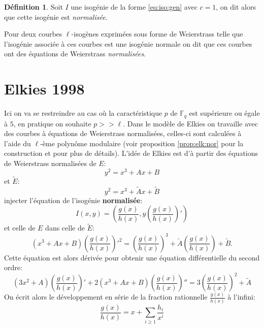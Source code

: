 \documentclass[10pt,a4paper]{book}
\theoremstyle{plain}
\theoremstyle{definition}
\theoremstyle{definition}
\theoremstyle{definition}
\theoremstyle{definition}
\newtheorem{defi}[thm]{Définition}
\theoremstyle{remark}
\theoremstyle{remark}
\theoremstyle{definition}
\begin{document}
\begin{defi}
Soit $I$ une isogénie de la forme \eqref{eq:iso:gen} avec $c=1$, on dit alors que cette isogénie est \emph{normalisée}. 

Pour deux courbes $\ell$-isogènes exprimées sous forme de Weierstrass telle que l'isogénie associée à ces courbes est une isogénie normale on dit que ces courbes ont des équations de Weierstrass \emph{normalisées}. 
\end{defi}
\section{Elkies 1998}
Ici on va se restreindre au cas où la caractéristique $p$ de $\mathbb{F}_q$ est supérieure ou égale à $5$, en pratique on souhaite $p >> \ell$.
Dans le modèle de Elkies on travaille avec des courbes à équations de Weierstrass normalisées, celles-ci sont calculées à l'aide du $\ell$-ème polynôme modulaire (voir proposition \ref{prop:elk:nor} pour la construction et \cite{Schoof95} pour plus de détails).
L'idée de Elkies est d'à partir des équations de Weierstrass normalisées de $E:$
\begin{equation}
y^2=x^3+Ax+B
\end{equation}
 et $\tilde{E}:$
\begin{equation}
y^2=x^3+\tilde{A}x+\tilde{B}
\end{equation}
injecter l'équation de l'isogénie \textbf{normalisée}:
\begin{equation} 
\label{eq:velu:gh}
I(x,y)=\left(\frac{g(x)}{h(x)},y\left( \frac{g(x)}{h(x)} \right)'\right) 
\end{equation}
et celle de $E$ dans celle de $\tilde{E}$:
\begin{equation}
(x^3+Ax+B)\left(\frac{g(x)}{h(x)} \right)'^2=  \left(\frac{g(x)}{h(x)} \right)^3 + \tilde{A} \left(\frac{g(x)}{h(x)} \right) + \tilde{B}.
\end{equation}
Cette équation est alors dérivée pour obtenir une équation différentielle du second ordre:
\begin{equation}
\label{eq:Elkies-deriv}
(3x^2+A)\left(\frac{g(x)}{h(x)} \right)'+2(x^3+Ax+B)\left(\frac{g(x)}{h(x)} \right)''=  3\left(\frac{g(x)}{h(x)} \right)^2 + \tilde{A}
\end{equation}
On écrit alors le développement en série de la fraction rationnelle $\frac{g(x)}{h(x)}$ à l'infini:
\begin{equation}
\label{eq:iso:frac}
\frac{g(x)}{h(x)}=x+ \sum_{i\geqslant 1} \frac{h_i}{x^i}
\end{equation}
\end{document}
